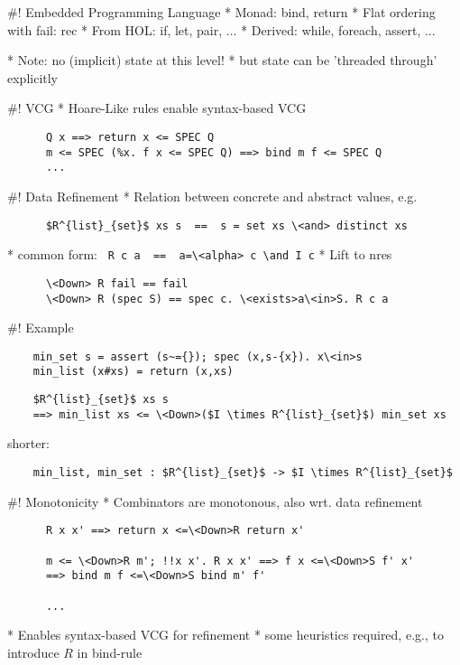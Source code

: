\documentclass[fleqn]{beamer}
\begin{document}
#! Embedded Programming Language
  * Monad: bind, return
  * Flat ordering with fail: rec
  * From HOL: if, let, pair, ...
  * Derived: while, foreach, assert, ...

  * Note: no (implicit) state at this level!
    * but state can be 'threaded through' explicitly

#! VCG
  * Hoare-Like rules enable syntax-based VCG
    \begin{lstlisting}
      Q x ==> return x <= SPEC Q
      m <= SPEC (%x. f x <= SPEC Q) ==> bind m f <= SPEC Q
      ...
    \end{lstlisting}

#! Data Refinement
  * Relation between concrete and abstract values, e.g.
    \begin{lstlisting}
      $R^{list}_{set}$ xs s  ==  s = set xs \<and> distinct xs
    \end{lstlisting}
    * common form: \lstinline{ R c a  ==  a=\<alpha> c \and I c}
  * Lift to nres
    \begin{lstlisting}
      \<Down> R fail == fail
      \<Down> R (spec S) == spec c. \<exists>a\<in>S. R c a
    \end{lstlisting}

#! Example
  \begin{lstlisting}
    min_set s = assert (s~={}); spec (x,s-{x}). x\<in>s
    min_list (x#xs) = return (x,xs)
  \end{lstlisting}

  \begin{lstlisting}
    $R^{list}_{set}$ xs s
    ==> min_list xs <= \<Down>($I \times R^{list}_{set}$) min_set xs
  \end{lstlisting}

  shorter:
  \begin{lstlisting}
    min_list, min_set : $R^{list}_{set}$ -> $I \times R^{list}_{set}$
  \end{lstlisting}

#! Monotonicity
  * Combinators are monotonous, also wrt. data refinement
    \begin{lstlisting}
      R x x' ==> return x <=\<Down>R return x'

      m <= \<Down>R m'; !!x x'. R x x' ==> f x <=\<Down>S f' x'
      ==> bind m f <=\<Down>S bind m' f'

      ...
    \end{lstlisting}

  * Enables syntax-based VCG for refinement
    * some heuristics required, e.g., to introduce $R$ in bind-rule
\end{document}
